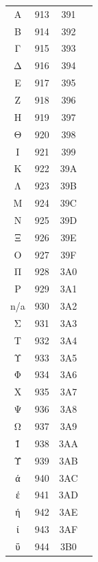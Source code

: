 ﻿\documentclass[10pt]{article}
\begin{document}
\begin{tabular}{crcl}
Α&913&391&\\
Β&914&392&\\
Γ&915&393&\\
Δ&916&394&\\
Ε&917&395&\\
Ζ&918&396&\\
Η&919&397&\\
Θ&920&398&\\
Ι&921&399&\\
Κ&922&39A&\\
Λ&923&39B&\\
Μ&924&39C&\\
Ν&925&39D&\\
Ξ&926&39E&\\
Ο&927&39F&\\
Π&928&3A0&\\
Ρ&929&3A1&\\
n/a&930&3A2&\\
Σ&931&3A3&\\
Τ&932&3A4&\\
Υ&933&3A5&\\
Φ&934&3A6&\\
Χ&935&3A7&\\
Ψ&936&3A8&\\
Ω&937&3A9&\\
Ϊ&938&3AA&\\
Ϋ&939&3AB&\\
ά&940&3AC&\\
έ&941&3AD&\\
ή&942&3AE&\\
ί&943&3AF&\\
ΰ&944&3B0&\\
\end{tabular}
\end{document}
